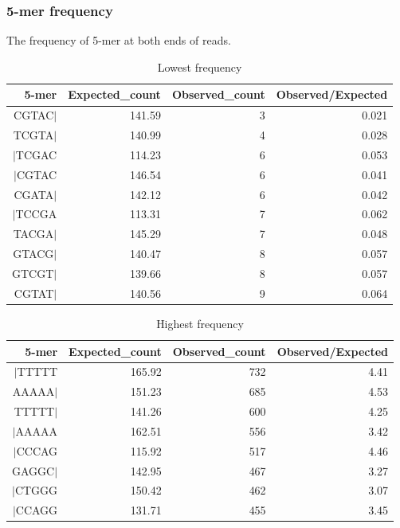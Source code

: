 \documentclass{article}
\begin{document}
\subsubsection{5-mer frequency}
The frequency of 5-mer at both ends of reads.
\begin{center}
{\scriptsize
\begin{longtable}{|r|r|r|r|}
\caption{Lowest frequency} \\ 
  \hline
5-mer & Expected\_count & Observed\_count & Observed/Expected \\ 
  \hline
CGTAC$|$ & 141.59 & 3 & 0.021 \\ 
   \rowcolor[gray]{0.9}TCGTA$|$ & 140.99 & 4 & 0.028 \\ 
  $|$TCGAC & 114.23 & 6 & 0.053 \\ 
   \rowcolor[gray]{0.9}$|$CGTAC & 146.54 & 6 & 0.041 \\ 
  CGATA$|$ & 142.12 & 6 & 0.042 \\ 
   \rowcolor[gray]{0.9}$|$TCCGA & 113.31 & 7 & 0.062 \\ 
  TACGA$|$ & 145.29 & 7 & 0.048 \\ 
   \rowcolor[gray]{0.9}GTACG$|$ & 140.47 & 8 & 0.057 \\ 
  GTCGT$|$ & 139.66 & 8 & 0.057 \\ 
   \rowcolor[gray]{0.9}CGTAT$|$ & 140.56 & 9 & 0.064 \\ 
   \hline
\hline
\end{longtable}
}%
{\scriptsize
\begin{longtable}{|r|r|r|r|}
\caption{Highest frequency} \\ 
  \hline
5-mer & Expected\_count & Observed\_count & Observed/Expected \\ 
  \hline
$|$TTTTT & 165.92 & 732 & 4.41 \\ 
   \rowcolor[gray]{0.9}AAAAA$|$ & 151.23 & 685 & 4.53 \\ 
  TTTTT$|$ & 141.26 & 600 & 4.25 \\ 
   \rowcolor[gray]{0.9}$|$AAAAA & 162.51 & 556 & 3.42 \\ 
  $|$CCCAG & 115.92 & 517 & 4.46 \\ 
   \rowcolor[gray]{0.9}GAGGC$|$ & 142.95 & 467 & 3.27 \\ 
  $|$CTGGG & 150.42 & 462 & 3.07 \\ 
   \rowcolor[gray]{0.9}$|$CCAGG & 131.71 & 455 & 3.45 \\ 

\end{longtable}}
\end{center}
\end{document}
